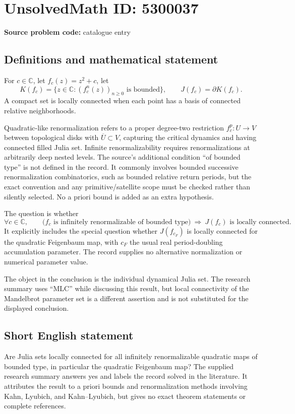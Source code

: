 \documentclass[11pt]{article}
\newcommand{\C}{\mathbb{C}}
\begin{document}
\section*{UnsolvedMath ID: 5300037}
\textbf{Source problem code:} catalogue entry
\subsection{Definitions and mathematical statement}
For $c\in\C$, let $f_c(z)=z^2+c$, let
\[
 K(f_c)=\{z\in\C:(f_c^n(z))_{n\ge0}\text{ is bounded}\},
 \qquad J(f_c)=\partial K(f_c).
\]
A compact set is locally connected when each point has a basis of connected relative neighborhoods.

Quadratic-like renormalization refers to a proper degree-two restriction $f_c^p:U\to V$ between topological disks with $\overline U\subset V$, capturing the critical dynamics and having connected filled Julia set. Infinite renormalizability requires renormalizations at arbitrarily deep nested levels. The source's additional condition ``of bounded type'' is not defined in the record. It commonly involves bounded successive renormalization combinatorics, such as bounded relative return periods, but the exact convention and any primitive/satellite scope must be checked rather than silently selected. No a priori bound is added as an extra hypothesis.

The question is whether
\[
 \forall c\in\C,\qquad
 \bigl(f_c\text{ is infinitely renormalizable of bounded type}\bigr)
 \ \Longrightarrow\ J(f_c)\text{ is locally connected}.
\]
It explicitly includes the special question whether $J(f_{c_F})$ is locally connected for the quadratic Feigenbaum map, with $c_F$ the usual real period-doubling accumulation parameter. The record supplies no alternative normalization or numerical parameter value.

The object in the conclusion is the individual dynamical Julia set. The research summary uses ``MLC'' while discussing this result, but local connectivity of the Mandelbrot parameter set is a different assertion and is not substituted for the displayed conclusion.
\subsection{Short English statement}
Are Julia sets locally connected for all infinitely renormalizable quadratic maps of bounded type, in particular the quadratic Feigenbaum map? The supplied research summary answers yes and labels the record solved in the literature. It attributes the result to a priori bounds and renormalization methods involving Kahn, Lyubich, and Kahn--Lyubich, but gives no exact theorem statements or complete references.
\end{document}

